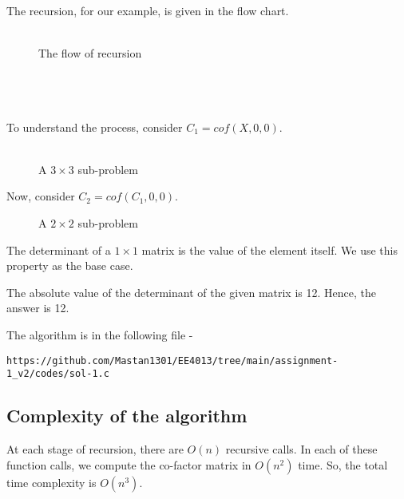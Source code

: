 \documentclass[journal,12pt,twocolumn]{IEEEtran}
\begin{document}
The recursion, for our example, is given in the flow chart. \\ \\

\begin{figure}[h!]
	\begin{center}
		\resizebox{\columnwidth/1}{!}{}
	\end{center}
	\caption{The flow of recursion}
	\label{fig:fig1}
\end{figure}

\\ \\ \\ To understand the process, consider $C_1 = cof(X, 0, 0)$. \\ \\

\begin{figure}[h!]
	\begin{center}
		\resizebox{\columnwidth/1}{!}{}
	\end{center}
	\caption{A $3 \times 3$ sub-problem}
	\label{fig:fig2}
\end{figure}

Now, consider $C_2 = cof(C_1, 0, 0)$. 

\begin{figure}[h!]
	\begin{center}
		\resizebox{\columnwidth/1}{!}{}
	\end{center}
	\caption{A $2 \times 2$ sub-problem}
	\label{fig:fig3}
\end{figure}

The determinant of a $1 \times 1$ matrix is the value of the element itself. We use this property as the base case.

The absolute value of the determinant of the given matrix is 12. Hence, the answer is 12.

The algorithm is in the following file - 
\begin{lstlisting}
https://github.com/Mastan1301/EE4013/tree/main/assignment-1_v2/codes/sol-1.c
\end{lstlisting}

\subsection{Complexity of the algorithm}
At each stage of recursion, there are $O(n)$ recursive calls. In each of these function calls, we compute the co-factor matrix in $O(n ^ 2)$ time. So, the total time complexity is $O(n ^ 3)$.
\end{document}

